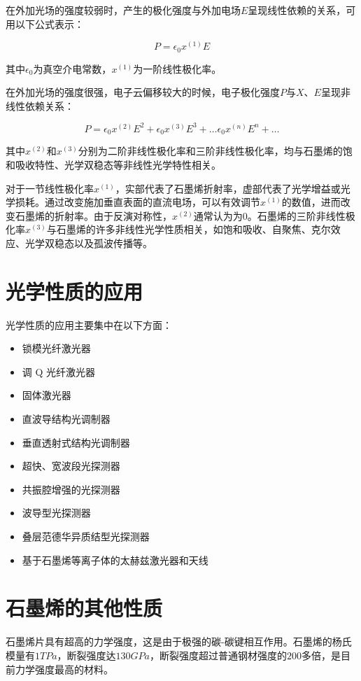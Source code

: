 在外加光场的强度较弱时，产生的极化强度与外加电场$E$呈现线性依赖的关系，可用以下公式表示：

\begin{equation}
    P = \epsilon_0 x^{(1)}E
\end{equation}

其中$\epsilon_0$为真空介电常数，$x^{(1)}$为一阶线性极化率。

在外加光场的强度很强，电子云偏移较大的时候，电子极化强度$P$与$X$、$E$呈现非线性依赖关系：

\begin{equation}
    P = \epsilon_0 x^{(2)}E^2 + \epsilon_0 x^{(3)}E^3 + \ldots \epsilon_0 x^{(n)}E^n +\ldots
\end{equation}

其中$x^{(2)}$和$x^{(3)}$分别为二阶非线性极化率和三阶非线性极化率，均与石墨烯的饱和吸收特性、光学双稳态等非线性光学特性相关。

对于一节线性极化率$x^{(1)}$，实部代表了石墨烯折射率，虚部代表了光学增益或光学损耗。通过改变施加垂直表面的直流电场，可以有效调节$x^{(1)}$的数值，进而改变石墨烯的折射率。由于反演对称性，$x^{(2)}$通常认为为$0$。石墨烯的三阶非线性极化率$x^{(3)}$与石墨烯的许多非线性光学性质相关，如饱和吸收、自聚焦、克尔效应、光学双稳态以及孤波传播等。

\section{光学性质的应用}

光学性质的应用主要集中在以下方面：

\begin{itemize}
    \item 锁模光纤激光器
    \item 调 Q 光纤激光器
    \item 固体激光器
    \item 直波导结构光调制器
    \item 垂直透射式结构光调制器
    \item 超快、宽波段光探测器
    \item 共振腔增强的光探测器
    \item 波导型光探测器
    \item 叠层范德华异质结型光探测器
    \item 基于石墨烯等离子体的太赫兹激光器和天线
\end{itemize}

\section{石墨烯的其他性质}
石墨烯片具有超高的力学强度，这是由于极强的碳-碳键相互作用。石墨烯的杨氏模量有$1TPa$\cite{RN43}，断裂强度达$130GPa$，断裂强度超过普通钢材强度的$200$多倍\cite{RN43}，是目前力学强度最高的材料。

